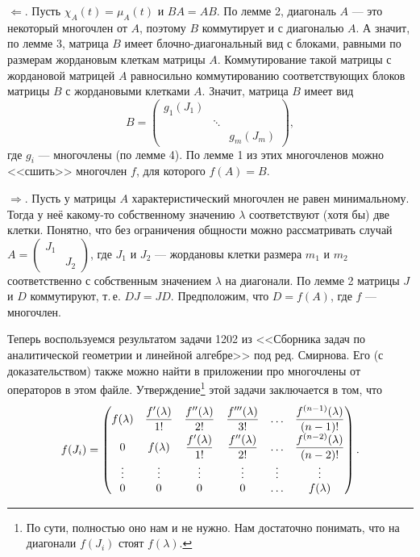 \begin{solution}
    $\Leftarrow$. Пусть $\chi_A(t) = \mu_A(t)$ и $BA = AB$. По лемме 2, диагональ $A$ --- это некоторый многочлен от $A$, поэтому $B$ коммутирует и с диагональю $A$. А значит, по лемме 3, матрица $B$ имеет блочно-диагональный вид с блоками, равными по размерам жордановым клеткам матрицы $A$. Коммутирование такой матрицы с жордановой матрицей $A$ равносильно коммутированию соответствующих блоков матрицы $B$ с жордановыми клетками $A$. Значит, матрица $B$ имеет вид
    \[
        B =
        \begin{pmatrix}
            g_1(J_1) & & \\
             & \ddots & \\
             & & g_m(J_m)
        \end{pmatrix},
    \]
    где $g_i$ --- многочлены (по лемме 4). По лемме 1 из этих многочленов можно <<сшить>> многочлен $f$, для которого $f(A) = B$.

    $\Rightarrow$. Пусть у матрицы $A$ характеристический многочлен не равен минимальному. Тогда у неё какому-то собственному значению $\lambda$ соответствуют (хотя бы) две клетки. Понятно, что без ограничения общности можно рассматривать случай
    $
    A =
    \begin{pmatrix}
        J_1 & \\
         & J_2
    \end{pmatrix}
    $, где $J_1$ и $J_2$ --- жордановы клетки размера $m_1$ и $m_2$ соответственно с собственным значением $\lambda$ на диагонали. По лемме 2 матрицы $J$ и $D$ коммутируют, т.\,е. $DJ = JD$. Предположим, что $D = f(A)$, где $f$ --- многочлен.

    Теперь воспользуемся результатом задачи 1202 из <<Сборника задач по аналитической геометрии и линейной алгебре>> под ред. Смирнова. Его (с доказательством) также можно найти в приложении про многочлены от операторов в этом файле. Утверждение\footnote{По сути, полностью оно нам и не нужно. Нам достаточно понимать, что на диагонали $f(J_i)$ стоят $f(\lambda)$.} этой задачи заключается в том, что
    \[
        f(J_i) =
        \begin{pmatrix}
            \displaystyle f(\lambda) & \displaystyle\frac{f^\prime(\lambda)}{1!} & \displaystyle\frac{f^{\prime\prime}(\lambda)}{2!} & \displaystyle\frac{f^{\prime\prime\prime}(\lambda)}{3!} & \ldots & \displaystyle\frac{f^{(n - 1)}(\lambda)}{(n - 1)!}\\
            0 & \displaystyle f(\lambda) & \displaystyle\frac{f^\prime(\lambda)}{1!} & \displaystyle\frac{f^{\prime\prime}(\lambda)}{2!} & \ldots & \displaystyle\frac{f^{(n - 2)}(\lambda)}{(n - 2)!}\\
            \vdots & \vdots & \vdots & \vdots & \vdots & \vdots\\
            0 & 0 & 0 & 0 & \ldots & f(\lambda)
        \end{pmatrix}.
    \]


\end{solution}
